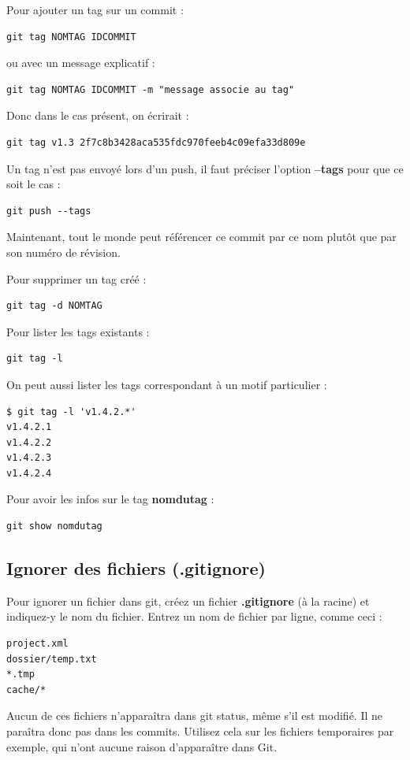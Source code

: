 \documentclass[a4paper,twoside]{article}
\begin{document}
Pour ajouter un tag sur un commit :
\begin{verbatim}
git tag NOMTAG IDCOMMIT
\end{verbatim}
ou avec un message explicatif :
\begin{verbatim}
git tag NOMTAG IDCOMMIT -m "message associe au tag"
\end{verbatim}


Donc dans le cas présent, on écrirait :
\begin{verbatim}
git tag v1.3 2f7c8b3428aca535fdc970feeb4c09efa33d809e
\end{verbatim}

Un tag n'est pas envoyé lors d'un push, il faut préciser l'option \textbf{--tags} pour que ce soit le cas :
\begin{verbatim}
git push --tags
\end{verbatim}

Maintenant, tout le monde peut référencer ce commit par ce nom plutôt que par son numéro de révision.

\bigskip

Pour supprimer un tag créé :
\begin{verbatim}
git tag -d NOMTAG
\end{verbatim}

\bigskip

Pour lister les tags existants :
\begin{verbatim}
git tag -l
\end{verbatim}

On peut aussi lister les tags correspondant à un motif particulier : 
\begin{verbatim}
$ git tag -l 'v1.4.2.*'
v1.4.2.1
v1.4.2.2
v1.4.2.3
v1.4.2.4
\end{verbatim}

\bigskip

Pour avoir les infos sur le tag \textbf{nomdutag} : 
\begin{verbatim}
git show nomdutag
\end{verbatim}



\subsection{Ignorer des fichiers (.gitignore)}
Pour ignorer un fichier dans git, créez un fichier \textbf{.gitignore} (à la racine) et indiquez-y le nom du fichier. Entrez un nom de fichier par ligne, comme ceci :
\begin{verbatim}
project.xml
dossier/temp.txt
*.tmp
cache/*
\end{verbatim}
Aucun de ces fichiers n'apparaîtra dans git status, même s'il est modifié. Il ne paraîtra donc pas dans les commits.
Utilisez cela sur les fichiers temporaires par exemple, qui n'ont aucune raison d'apparaître dans Git.
\end{document}
